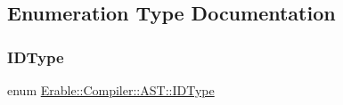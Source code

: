 \subsection{Enumeration Type Documentation}
\mbox{\label{namespace_erable_1_1_compiler_1_1_a_s_t_aefbd8bfc43f2ca072b77b8774ac8e5cf}} 
\subsubsection{\texorpdfstring{IDType}{IDType}}
{\footnotesize\ttfamily enum \mbox{\hyperlink{namespace_erable_1_1_compiler_1_1_a_s_t_aefbd8bfc43f2ca072b77b8774ac8e5cf}{Erable\+::\+Compiler\+::\+A\+S\+T\+::\+I\+D\+Type}}}

